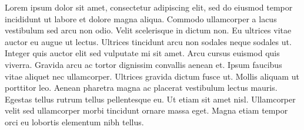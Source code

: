 Lorem ipsum dolor sit amet, consectetur adipiscing elit, sed do eiusmod tempor incididunt ut labore et dolore magna aliqua. Commodo ullamcorper a lacus vestibulum sed arcu non odio. Velit scelerisque in dictum non. Eu ultrices vitae auctor eu augue ut lectus. Ultrices tincidunt arcu non sodales neque sodales ut. Integer quis auctor elit sed vulputate mi sit amet. Arcu cursus euismod quis viverra. Gravida arcu ac tortor dignissim convallis aenean et. Ipsum faucibus vitae aliquet nec ullamcorper. Ultrices gravida dictum fusce ut. Mollis aliquam ut porttitor leo. Aenean pharetra magna ac placerat vestibulum lectus mauris. Egestas tellus rutrum tellus pellentesque eu. Ut etiam sit amet nisl. Ullamcorper velit sed ullamcorper morbi tincidunt ornare massa eget. Magna etiam tempor orci eu lobortis elementum nibh tellus.

